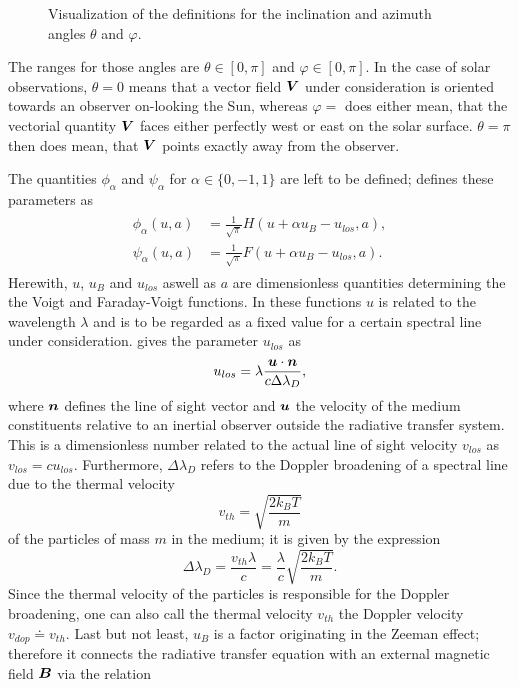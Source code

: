 \documentclass[a4paper,12pt]{report}
\begin{document}
\begin{figure}[h]
\caption{Visualization of the definitions for the inclination and azimuth angles $\theta$ and $\varphi$.}
\label{fig:inclinationazimuth}
\end{figure} The ranges for those angles are $\theta \in [0,\pi]$ and $\varphi \in [0,\pi]$. In the case of solar observations, $\theta = 0$ means that a vector field $\bm{V}$ under consideration is oriented towards an observer on-looking the Sun, whereas $\varphi=$ does either mean, that the vectorial quantity $\bm{V}$ faces either perfectly west or east on the solar surface. $\theta=\pi$ then does mean, that $\bm{V}$ points exactly away from the observer.

The quantities $\phi_\alpha$ and $\psi_\alpha$ for $\alpha \in \{0,-1,1\}$ are left to be defined; \cite[p.123]{delToroIniesta.2003} defines these parameters as \begin{align}
\begin{aligned}
\phi_\alpha(u,a) &= \frac{1}{\sqrt{\pi}}H(u + \alpha u_B - u_{los}, a), \\
\psi_\alpha(u,a) &= \frac{1}{\sqrt{\pi}}F(u + \alpha u_B - u_{los},a).
\end{aligned}
\end{align} Herewith, $u$, $u_B$ and $u_{los}$ aswell as $a$ are dimensionless quantities determining the the Voigt and Faraday-Voigt functions. In these functions $u$ is related to the wavelength $\lambda$ and is to be regarded as a fixed value for a certain spectral line under consideration. \cite[p.21]{UitenbroekNSME.2020} gives the parameter $u_{los}$ as \begin{equation}
u_{los} = \lambda\frac{\bm{u}\cdot\bm{n}}{c\Delta\lambda_D},
\end{equation} where $\bm{n}$ defines the line of sight vector and $\bm{u}$ the velocity of the medium constituents relative to an inertial observer outside the radiative transfer system. This is a dimensionless number related to the actual line of sight velocity $v_{los}$ as $v_{los} = cu_{los}$. Furthermore, $\Delta \lambda_D$ refers to the Doppler broadening of a spectral line due to the thermal velocity \begin{equation}
v_{th} = \sqrt{\frac{2k_BT}{m}}
\end{equation} of the particles of mass $m$ in the medium; it is given by the expression \begin{equation}
\Delta \lambda_D = \frac{v_{th}\lambda}{c} = \frac{\lambda}{c}\sqrt{\frac{2k_B T}{m}}.
\end{equation} Since the thermal velocity of the particles is responsible for the Doppler broadening, one can also call the thermal velocity $v_{th}$ the Doppler velocity $v_{dop} \doteq v_{th}$. Last but not least, $u_B$ is a factor originating in the Zeeman effect; therefore it connects the radiative transfer equation with an external magnetic field $\bm{B}$ via the relation \begin{equation}

\end{equation}
\end{document}
